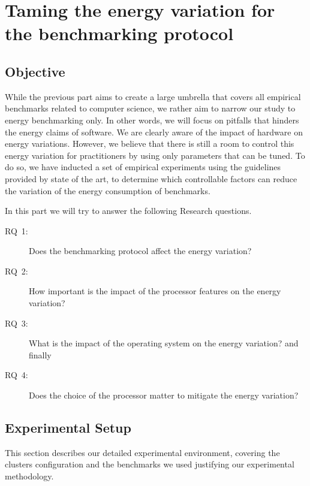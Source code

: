
\section{Taming the energy variation for the benchmarking protocol}\label{sec:taming-the-energy-variation}


\subsection{Objective}
While the previous part aims to create a large umbrella that covers all empirical benchmarks related to computer science, we rather aim to narrow our study to energy benchmarking only.
In other words, we will focus on pitfalls that hinders the energy claims of software.
We are clearly aware of the impact of hardware on energy variations.
However, we believe that there is still a room to control this energy variation for practitioners by using only parameters that can be tuned.
To do so, we have inducted a set of empirical experiments using the guidelines provided by state of the art, to determine which controllable factors can reduce the variation of the energy consumption of benchmarks.

In this part we will try to answer the following Research questions.

\begin{description}
    \item[\textsc{RQ}~1:] Does the benchmarking protocol affect the energy variation?
    \item[\textsc{RQ}~2:] How important is the impact of the processor features on the energy variation?
    \item[\textsc{RQ}~3:] What is the impact of the operating system on the energy variation? and finally
    \item[\textsc{RQ}~4:] Does the choice of the processor matter to mitigate the energy variation?
\end{description}


\subsection{Experimental Setup}\label{subsec:setup}
This section describes our detailed experimental environment, covering the clusters configuration and the benchmarks we used  justifying our experimental methodology.

